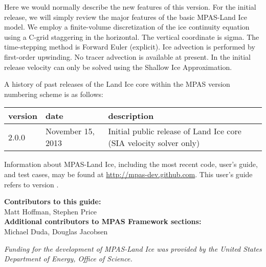 Here we would normally describe the new features of this version.  For the initial release, we will simply review the major features of the basic MPAS-Land Ice model.  We employ a finite-volume discretization of the ice continuity equation using a C-grid staggering in the horizontal.  The vertical coordinate is sigma.  The time-stepping method is Forward Euler (explicit).  Ice advection is performed by first-order upwinding.  No tracer advection is available at present. In the initial release velocity can only be solved using the Shallow Ice Approximation. 


A history of past releases of the Land Ice core within the MPAS version numbering scheme is as follows:

\begin{tabular}{lll} 
\hline\hline version & date & description  \\
\hline 
2.0.0 & November 15, 2013 & Initial public release of Land Ice core (SIA velocity solver only) \\
\hline 
\end{tabular} 

Information about MPAS-Land Ice, including the most recent code, user's guide, and test cases, may be found at \url{http://mpas-dev.github.com}.  This user's guide refers to version \version.

\vspace{8pt}
\noindent
{\bf Contributors to this guide:}\\
Matt Hoffman, Stephen Price\\
{\bf Additional contributors to MPAS Framework sections:}\\
Michael Duda, Douglas Jacobsen

\vspace{8pt}
\noindent
{\it Funding for the development of MPAS-Land Ice was provided by the United States Department of Energy, Office of Science.}




